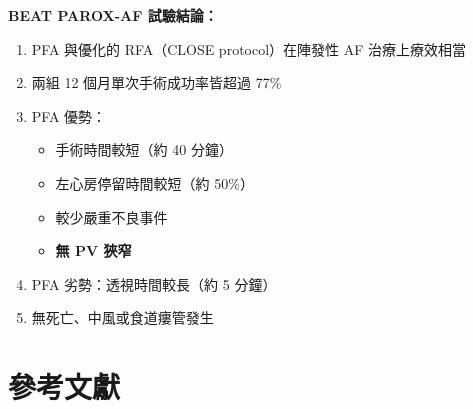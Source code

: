 \documentclass[12pt,a4paper]{article}
\begin{document}
\begin{importantbox}
\textbf{BEAT PAROX-AF 試驗結論：}
\begin{enumerate}[noitemsep]
    \item PFA 與優化的 RFA（CLOSE protocol）在陣發性 AF 治療上療效相當
    \item 兩組 12 個月單次手術成功率皆超過 77\%
    \item PFA 優勢：
    \begin{itemize}[noitemsep]
        \item 手術時間較短（約 40 分鐘）
        \item 左心房停留時間較短（約 50\%）
        \item 較少嚴重不良事件
        \item \textbf{無 PV 狹窄}
    \end{itemize}
    \item PFA 劣勢：透視時間較長（約 5 分鐘）
    \item 無死亡、中風或食道瘻管發生
\end{enumerate}
\end{importantbox}


\section{參考文獻}
\end{document}

